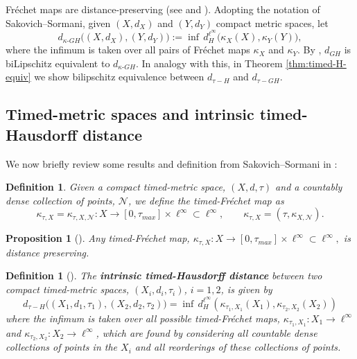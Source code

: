 \documentclass[a4paper,12pt,reqno]{amsart}
\theoremstyle{plain}
\newtheorem{prop}[thm]{Proposition}
\newtheorem{defn}[thm]{Definition}
\newcommand{\be}{\begin{equation}}
\newcommand{\ee}{\end{equation}}
\begin{document}
Fr\'echet maps are distance-preserving (see \cite{Frechet} and \cite{SakSor-Notions}). 
Adopting the notation of Sakovich--Sormani, given $(X,d_X)$ and $(Y,d_Y)$ compact metric spaces, let
\begin{equation*}
d_{\kappa\text{-}GH}\big((X,d_X),(Y,d_Y)\big)
:= \inf \, d_H^{\ell^\infty}\big(\kappa_X(X), \kappa_Y(Y)\big),
\end{equation*}
where the infimum is taken over all pairs of Fréchet maps $\kappa_X$ and $\kappa_Y$. 
By \cite[Proposition~2.7]{SakSor-Notions}, 
$d_{GH}$ is biLipschitz equivalent to $d_{\kappa  \text{-}GH}$.
In analogy with this, in Theorem \ref{thm:timed-H-equiv} we show bilipschitz 
equivalence between $d_{\tau-H}$ and $d_{\tau-GH}$.




\subsection{Timed-metric spaces and intrinsic timed-Hausdorff distance}

We now briefly review some results and definition from Sakovich--Sormani in
\cite{SakSor-Notions}:

\begin{defn}\label{defn:tau-K}
Given a compact timed-metric space, $(X,d,\tau)$
and a countably dense collection of points,
${\mathcal N}$,
we define the
timed-Fr\'echet map as 
\[
\kappa_{\tau,X}
=\kappa_{\tau,X,{\mathcal N}}: X \to [0,\tau_{max}]\times \ell^\infty\subset \ell^\infty,
\qquad 
\kappa_{\tau,X}=
(\tau,\kappa_{X,{\mathcal N}}).
\]
\end{defn}



\begin{prop}[\cite{SakSor-Notions}]
\label{prop:tau-K-dist-pres}
Any
timed-Fr\'echet map, 
$
\kappa_{\tau,X}: X \to [0,\tau_{max}]\times \ell^\infty\subset \ell^\infty,
$
is distance preserving.
\end{prop}




\begin{defn}[{\cite[Definition~4.22]{SakSor-Notions}}]\label{defn:timed-H}
The {\bf
intrinsic 
timed-Hausdorff
distance}
between two compact timed-metric spaces,
$(X_i, d_i, \tau_i)$, $i=1,2$, is given by
\be \label{eq:tK-GH-1}
d_{\tau-H}
\Big((X_1,d_1,\tau_1),(X_2,d_2,\tau_2)\Big)=
\inf\, d^{\ell^\infty}_H(
\kappa_{\tau_1,X_1}(X_1),
\kappa_{\tau_2,X_2}(X_2))
\ee
where the infimum is taken over all possible 
timed-Fr\'echet maps,
$\kappa_{\tau_1,X_1}:X_1\to \ell^\infty$ and
$\kappa_{\tau_2,X_2}:X_2\to \ell^\infty$, which are
found by considering all countable dense collections of points in the $X_i$ and all reorderings of these collections of points.
\end{defn}
\end{document}
